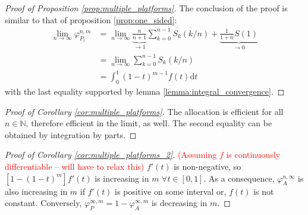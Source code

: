 \documentclass[a4paper]{article}
\newcommand{\dt}{\mathrm{d}t}
\begin{document}
\begin{proof}[Proof of Proposition \ref{prop:multiple_platforms}]
    The conclusion of the proof is similar to that of proposition \ref{prop:one_sided}:
    \begin{align*}
        \lim_{n \to \infty} \varphi_{P_i}^{n, m} &= \lim_{n \to \infty} \underbrace{\frac{n}{n+1}}_{\to 1} \sum_{k=0}^{n-1} S_k(k/n) + \underbrace{\frac{1}{1+n}S(1)}_{\to 0} \\
        &= \lim_{n \to \infty} \sum_{k=0}^{n-1} S_k(k/n) \\
        &= \int_0^1 (1-t)^{m-1} f(t) \dt
    \end{align*}
    with the last equality supported by lemma \ref{lemma:integral_convergence}.
\end{proof}

\begin{proof}[Proof of Corollary \ref{cor:multiple_platforms}]
    The allocation is efficient for all $n \in \mathbb{N}$, therefore efficient in the limit, as well. The second equality can be obtained by integration by parts.
\end{proof}

\begin{proof}[Proof of Corollary \ref{cor:multiple_platforms_2}] \textcolor{red}{(Assuming $f$ is continuously differentiable -- will have to relax this)}
    $f'(t)$ is non-negative, so $[1 - (1-t)^m] f'(t)$ is increasing in $m$ $\forall t \in [0, 1]$. As a consequence, $\varphi_A^{n, \infty}$ is also increasing in $m$ if $f'(t)$ is positive on some interval or, $f(t)$ is not constant. Conversely, $\varphi_{P}^{\infty, m} = 1 - \varphi_{A}^{\infty, m}$ is decreasing in $m$.
\end{proof}
\end{document}
